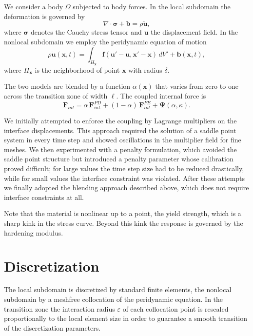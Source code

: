 \documentclass{article}
\begin{document}
We consider a body $\Omega$ subjected to body forces. In the local
subdomain the deformation is governed by
\begin{equation}
\nabla \cdot \boldsymbol{\sigma} + \mathbf{b} = \rho \ddot{\mathbf{u}},
\label{eq:local}
\end{equation}
where $\boldsymbol{\sigma}$ denotes the Cauchy stress tensor and $\mathbf{u}$
the displacement field. In the nonlocal subdomain we employ the peridynamic
equation of motion
\begin{equation}
\rho \ddot{\mathbf{u}}(\mathbf{x},t) = \int_{H_\mathbf{x}}
\mathbf{f}(\mathbf{u}'-\mathbf{u}, \mathbf{x}'-\mathbf{x})\, dV' +
\mathbf{b}(\mathbf{x},t),
\label{eq:pd}
\end{equation}
where $H_\mathbf{x}$ is the neighborhood of point $\mathbf{x}$ with radius
$\delta$.

The two models are blended by a function $\alpha(\mathbf{x})$ that varies
from zero to one across the transition zone of width $\ell$. The coupled
internal force is
\begin{equation}
\mathbf{F}_{int} = \alpha \, \mathbf{F}^{PD}_{int} + (1-\alpha)\,
\mathbf{F}^{FE}_{int} + \boldsymbol{\Psi}(\alpha, \kappa).
\label{eq:blend}
\end{equation}

We initially attempted to enforce the coupling by Lagrange multipliers on the
interface displacements. This approach required the solution of a saddle
point system in every time step and showed oscillations in the multiplier
field for fine meshes. We then experimented with a penalty formulation, which
avoided the saddle point structure but introduced a penalty parameter whose
calibration proved difficult; for large values the time step size had to be
reduced drastically, while for small values the interface constraint was
violated. After these attempts we finally adopted the blending approach
described above, which does not require interface constraints at all.

Note that the material is nonlinear up to a point, the yield strength, which
is a sharp kink in the stress curve. Beyond this kink the response is
governed by the hardening modulus.

\section{Discretization}

The local subdomain is discretized by standard finite elements, the nonlocal
subdomain by a meshfree collocation of the peridynamic equation. In the
transition zone the interaction radius $\varepsilon$ of each collocation
point is rescaled proportionally to the local element size in order to
guarantee a smooth transition of the discretization parameters.
\end{document}
